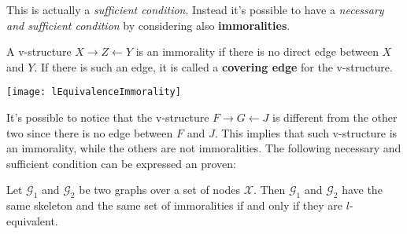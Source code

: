 This is actually a \textit{sufficient condition}. Instead it's possible to have a \textit{necessary and sufficient condition} by considering also \textbf{immoralities}.
\begin{definition}[Immorality]
  A v-structure $X\rightarrow Z\leftarrow Y$ is an immorality if there is no direct edge between $X$ and $Y$. If there is such an edge, it is called a \textbf{covering edge} for the v-structure.  
\end{definition}
\begin{center}
  \texttt{[image: lEquivalenceImmorality]}
\end{center}
It's possible to notice that the v-structure $F\rightarrow G\leftarrow J$ is different from the other two since there is no edge between $F$ and $J$. This implies that such v-structure is an immorality, while the others are not immoralities. \newline
The following necessary and sufficient condition can be expressed an proven:
\begin{theorem}
  Let $\mathcal{G}_1$ and $\mathcal{G}_2$ be two graphs over a set of nodes $\mathcal{X}$. Then $\mathcal{G}_1$ and $\mathcal{G}_2$ have the same skeleton and the same set of immoralities if and only if they are $l$-equivalent. 
\end{theorem}
%
%
